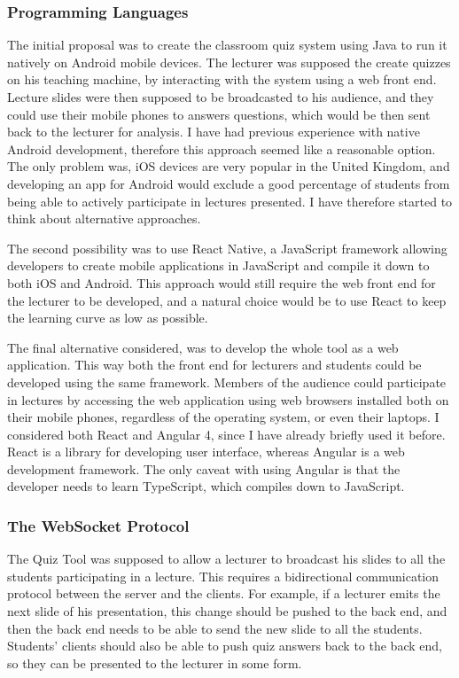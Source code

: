 \subsubsection{Programming Languages}
The initial proposal was to create the classroom quiz system using Java\cite{3} to run it natively
on Android\cite{4} mobile devices. The lecturer was supposed the create quizzes on his teaching
machine, by interacting with the system using a web front end. Lecture slides were then supposed
to be broadcasted to his audience, and they could use their mobile phones to answers questions,
which would be then sent back to the lecturer for analysis. I have had previous experience with
native Android development, therefore this approach seemed like a reasonable option. The only problem was,
iOS\cite{5} devices are very popular in the United Kingdom, and developing an app for Android would exclude
a good percentage of students from being able to actively participate in lectures presented. I have
therefore started to think about alternative approaches.

The second possibility was to use React Native\cite{6}, a JavaScript\cite{7} framework allowing
developers to create mobile applications in JavaScript and compile it down to both iOS and Android.
This approach would still require the web front end for the lecturer to be developed, and a natural
choice would be to use React\cite{8} to keep the learning curve as low as possible.

The final alternative considered, was to develop the whole tool as a web application. This way both the
front end for lecturers and students could be developed using the same framework. Members of the audience
could participate in lectures by accessing the web application using web browsers installed
both on their mobile phones, regardless of the operating system, or even their laptops. I considered
both React and Angular 4\cite{9}, since I have already briefly used it before. React is a library
for developing user interface, whereas Angular is a web development framework. The only caveat with
using Angular is that the developer needs to learn TypeScript\cite{10}, which compiles down to JavaScript.

\subsubsection{The WebSocket Protocol}
The Quiz Tool was supposed to allow a lecturer to broadcast his slides to all the students
participating in a lecture. This requires a bidirectional communication protocol between the
server and the clients. For example, if a lecturer emits the next slide of his presentation,
this change should be pushed to the back end, and then the back end needs to be able to
send the new slide to all the students. Students' clients should also be able to push quiz
answers back to the back end, so they can be presented to the lecturer in some form.

